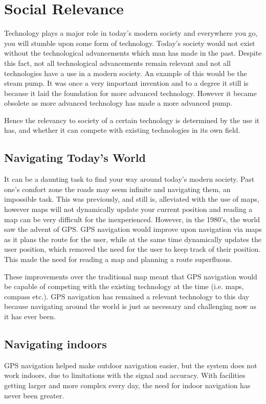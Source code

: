 \section{Social Relevance}


Technology plays a major role in today's modern society and everywhere you go, you will stumble upon some form of technology. Today's society would not exist without the technological advancements which man has made in the past. Despite this fact, not all technological advancements remain relevant and not all technologies have a use in a modern society. An example of this would be the steam pump. It was once a very important invention and to a degree it still is because it laid the foundation for more advanced technology. However it became obsolete as more advanced technology has made a more advanced pump. 

Hence the relevancy to society of a certain technology is determined by the use it has, and whether it can compete with existing technologies in its own field.

\subsection{Navigating Today's World}
It can be a daunting task to find your way around today's modern society. Past one's comfort zone the roads may seem infinite and navigating them, an impossible task. This was previously, and still is, alleviated with the use of maps, however maps will not dynamically update your current position and reading a map can be very difficult for the inexperienced. However, in the 1980's, the world saw the advent of GPS\cite{gps_advent}. GPS navigation would improve upon navigation via maps as it plans the route for the user, while at the same time dynamically updates the user position, which removed the need for the user to keep track of their position. This made the need for reading a map and planning a route superfluous.

These improvements over the traditional map meant that GPS navigation would be capable of competing with the existing technology at the time (i.e. maps, compass etc.). GPS navigation has remained a relevant technology to this day because navigating around the world is just as necessary and challenging now as it has ever been.

\subsection{Navigating indoors}
GPS navigation helped make outdoor navigation easier, but the system does not work indoors, due to limitations with the signal and accuracy\cite{gps_tech}. With facilities getting larger and more complex every day, the need for indoor navigation has never been greater.

